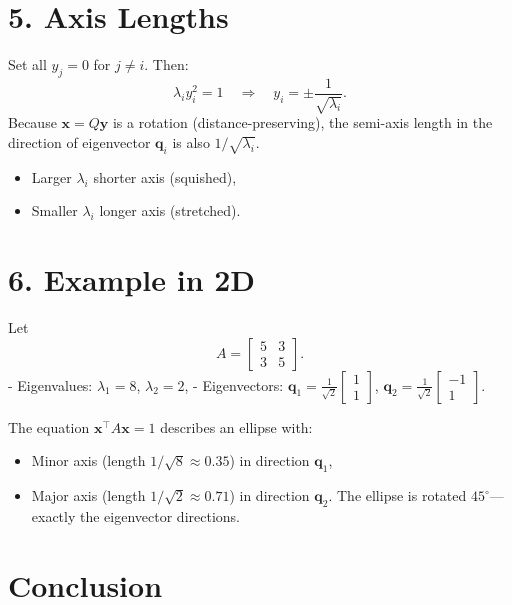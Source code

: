 \documentclass{article}
\begin{document}
\section*{5. Axis Lengths}

Set all $ y_j = 0 $ for $ j \ne i $. Then:
\[
\lambda_i y_i^2 = 1 \quad \Rightarrow \quad y_i = \pm \frac{1}{\sqrt{\lambda_i}}.
\]
Because $ \mathbf{x} = Q \mathbf{y} $ is a rotation (distance-preserving), the semi-axis length in the direction of eigenvector $ \mathbf{q}_i $ is also $ 1/\sqrt{\lambda_i} $.

\begin{itemize}
\item Larger $ \lambda_i $  shorter axis (squished),
    \item Smaller $ \lambda_i $  longer axis (stretched).
\end{itemize}

\section*{6. Example in 2D}

Let
\[
A = \begin{bmatrix} 5 & 3 \\ 3 & 5 \end{bmatrix}.
\]
- Eigenvalues: $ \lambda_1 = 8 $, $ \lambda_2 = 2 $,
- Eigenvectors: $ \mathbf{q}_1 = \frac{1}{\sqrt{2}} \begin{bmatrix} 1 \\ 1 \end{bmatrix} $, $ \mathbf{q}_2 = \frac{1}{\sqrt{2}} \begin{bmatrix} -1 \\ 1 \end{bmatrix} $.

The equation $ \mathbf{x}^\top A \mathbf{x} = 1 $ describes an ellipse with:

\begin{itemize}
\item Minor axis (length $ 1/\sqrt{8} \approx 0.35 $) in direction $ \mathbf{q}_1 $,
    \item Major axis (length $ 1/\sqrt{2} \approx 0.71 $) in direction $ \mathbf{q}_2 $.
The ellipse is rotated $ 45^\circ $—exactly the eigenvector directions.
\end{itemize}

\section*{Conclusion}
\end{document}
